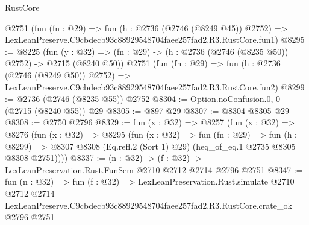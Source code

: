 \begin{lexlean}{RustCore}
\begin{coremodule}
    @2751
    (fun (fn : @29) =>
    fun (h : @2736 (@2746 (@8249 @45)) @2752) =>
    LexLeanPreserve.C9cbdecb93c88929548704faee257fad2.R3.RustCore.fun1)
@8295 := @8225
    (fun (y : @32) => (fn : @29) -> (h : @2736 (@2746 (@8235 @50)) @2752) -> @2715 (@8240 @50))
    @2751
    (fun (fn : @29) =>
    fun (h : @2736 (@2746 (@8249 @50)) @2752) =>
    LexLeanPreserve.C9cbdecb93c88929548704faee257fad2.R3.RustCore.fun2)
@8299 := @2736 (@2746 (@8235 @55)) @2752
@8304 := Option.noConfusion.{0, 0} (@2715 (@8240 @55)) @29
@8305 := @897 @29
@8307 := @8304 @8305 @29
@8308 := @2750 @2796
@8329 := fun (x : @32) =>
  @8257
    (fun (x : @32) =>
    @8276
      (fun (x : @32) =>
      @8295
        (fun (x : @32) =>
        fun (fn : @29) =>
        fun (h : @8299) =>
        @8307 @8308 (Eq.refl.{2} (Sort 1) @29) (heq_of_eq.{1} @2735 @8305 @8308 @2751))))
@8337 := (n : @32) -> (f : @32) -> LexLeanPreservation.Rust.FunSem @2710 @2712 @2714 @2796 @2751
@8347 := fun (n : @32) =>
  fun (f : @32) =>
  LexLeanPreservation.Rust.simulate
    @2710
    @2712
    @2714
    LexLeanPreserve.C9cbdecb93c88929548704faee257fad2.R3.RustCore.crate_ok
    @2796
    @2751
\end{coremodule}
\end{lexlean}
